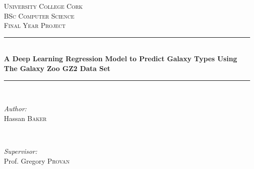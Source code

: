\documentclass[12pt,a4paper,oneside,oldfontcommands]{memoir}
\begin{document}
%
%
\thispagestyle{empty}

\begin{page}

\newcommand{\HRule}{\rule{\linewidth}{0.5mm}} %

\center %
 

\textsc{\LARGE University College Cork}\\[1.5cm] %
\textsc{\Large BSc Computer Science}\\[0.5cm] %
\textsc{\large Final Year Project}\\[0.5cm] %


\HRule \\[0.4cm]
{ \huge \bfseries A Deep Learning Regression Model to Predict Galaxy Types Using The Galaxy Zoo GZ2 Data Set
}\\[0.4cm] %
\HRule \\[1cm]
 

\begin{minipage}{0.4\textwidth}
\begin{flushleft} \large
\emph{Author:}\\
Hassan \textsc{Baker} %
\end{flushleft}
\end{minipage}
~
\begin{minipage}{0.4\textwidth}
\begin{flushright} \large
\emph{Supervisor:} \\
Prof. Gregory \textsc{Provan} %
\end{flushright}
\end{minipage}\\[1cm]


\end{page}
\end{document}
